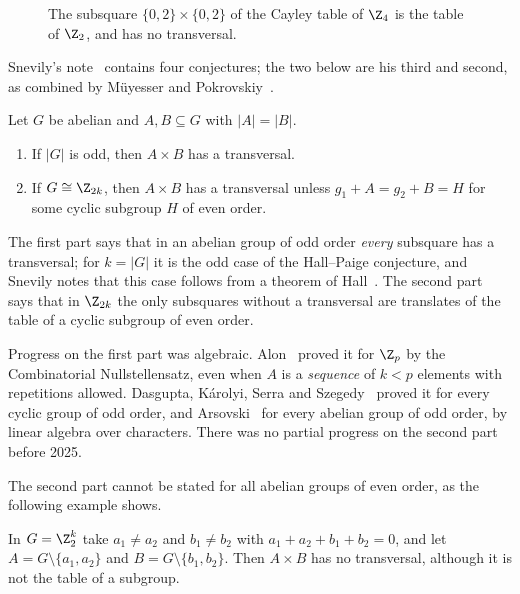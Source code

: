 \begin{figure}[ht]
\centering

\caption{The subsquare $\{0,2\}\times\{0,2\}$ of the Cayley table of $\Z_4$ is the table of $\Z_2$, and has no transversal.}
\label{fig:z4-subsquare}
\end{figure}

Snevily's note~\cite{sne99} contains four conjectures; the two below are his third and second, as combined by M\"uyesser and Pokrovskiy~\cite{mp25a}.

\begin{conjecture}\label{conj:snevily}
Let $G$ be abelian and $A,B\subseteq G$ with $|A|=|B|$.
\begin{enumerate}
\item If $|G|$ is odd, then $A\times B$ has a transversal.
\item If $G\cong\Z_{2k}$, then $A\times B$ has a transversal unless $g_1+A=g_2+B=H$ for some cyclic subgroup $H$ of even order.
\end{enumerate}
\end{conjecture}

The first part says that in an abelian group of odd order \emph{every} subsquare has a transversal; for $k=|G|$ it is the odd case of the Hall--Paige conjecture, and Snevily notes that this case follows from a theorem of Hall~\cite{hall52}. The second part says that in $\Z_{2k}$ the only subsquares without a transversal are translates of the table of a cyclic subgroup of even order.

Progress on the first part was algebraic. Alon~\cite{alon00} proved it for $\Z_p$ by the Combinatorial Nullstellensatz, even when $A$ is a \emph{sequence} of $k<p$ elements with repetitions allowed. Dasgupta, K\'arolyi, Serra and Szegedy~\cite{dkss01} proved it for every cyclic group of odd order, and Arsovski~\cite{ars11} for every abelian group of odd order, by linear algebra over characters. There was no partial progress on the second part before 2025.

The second part cannot be stated for all abelian groups of even order, as the following example shows.

\begin{example}\label{ex:akbari-alipour}
In $G=\Z_2^k$ take $a_1\neq a_2$ and $b_1\neq b_2$ with $a_1+a_2+b_1+b_2=0$, and let $A=G\setminus\{a_1,a_2\}$ and $B=G\setminus\{b_1,b_2\}$. Then $A\times B$ has no transversal, although it is not the table of a subgroup.
\end{example}

